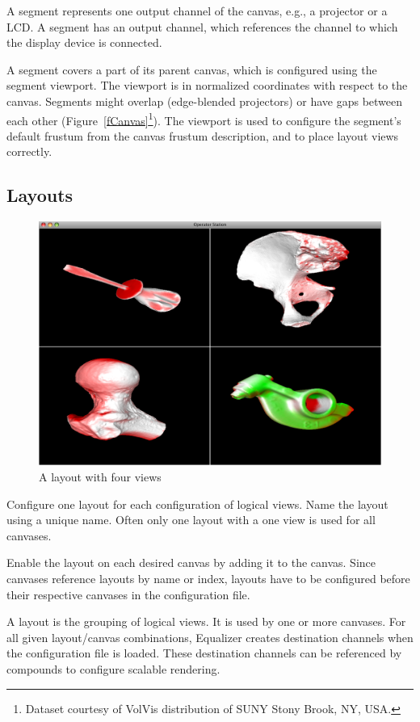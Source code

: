 \documentclass[10pt,a4]{scrartcl}
\newcommand{\fig}[1]{Figure~\ref{#1}}
\begin{document}
A segment represents one output channel of the canvas, e.g., a projector
or a LCD. A segment has an output channel, which references the channel to
which the display device is connected.

A segment covers a part of its parent canvas, which is configured using
the segment viewport. The viewport is in normalized coordinates with
respect to the canvas. Segments might overlap (edge-blended projectors)
or have gaps between each other (\fig{fCanvas}\footnote{Dataset courtesy
  of VolVis distribution of SUNY Stony Brook, NY, USA.}). The viewport
is used to configure the segment's default frustum from the canvas
frustum description, and to place layout views correctly.

\subsection{\label{sLayout}Layouts}

\begin{figure}
  \includegraphics[width=.382\textwidth]{images/layout.png}
  {\caption{\label{fLayout}A layout with four views}}
\end{figure}

Configure one \textsf{layout} for each configuration of logical
views. Name the layout using a unique name. Often only one layout with a
one view is used for all canvases.

Enable the layout on each desired canvas by adding it to the
canvas. Since canvases reference layouts by name or index, layouts have
to be configured before their respective canvases in the configuration
file.

A layout is the grouping of logical views. It is used by one or more
canvases. For all given layout/canvas combinations, Equalizer creates
destination channels when the configuration file is loaded. These
destination channels can be referenced by compounds to configure
scalable rendering.
\end{document}
